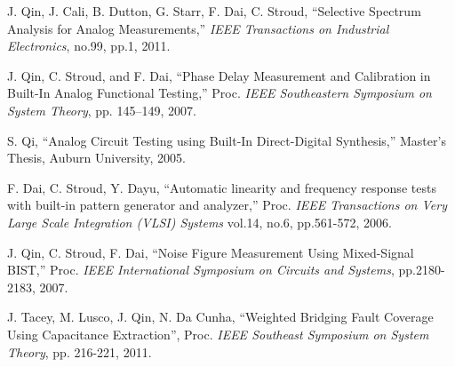 \documentclass[12pt]{report}
\begin{document}
\begin{thebibliography}{99}
 J. Qin, J. Cali, B. Dutton, G. Starr, F. Dai, C. Stroud, ``Selective Spectrum Analysis for Analog Measurements,'' \textit{IEEE Transactions on Industrial Electronics}, no.99, pp.1, 2011.

 J. Qin, C. Stroud, and F. Dai, ``Phase Delay Measurement and Calibration in Built-In Analog Functional Testing,” Proc. \textit{IEEE Southeastern Symposium on System Theory}, pp. 145–149, 2007.

 S. Qi, ``Analog Circuit Testing using Built-In Direct-Digital Synthesis,'' Master's Thesis, Auburn University, 2005.

 F. Dai, C. Stroud, Y. Dayu, ``Automatic linearity and frequency response tests with built-in pattern generator and analyzer,'' Proc. \textit{IEEE Transactions on Very Large Scale Integration (VLSI) Systems} vol.14, no.6, pp.561-572, 2006.

 J. Qin, C. Stroud, F. Dai, ``Noise Figure Measurement Using Mixed-Signal BIST,'' Proc. \textit{IEEE International Symposium on Circuits and Systems}, pp.2180-2183, 2007.

 J. Tacey, M. Lusco, J. Qin, N. Da Cunha, ``Weighted Bridging Fault Coverage Using Capacitance Extraction'', Proc.  \textit{IEEE Southeast Symposium on System Theory}, pp. 216-221, 2011.


\label{Bibliography}
\end{thebibliography}

\appendix
{}
\end{document}
